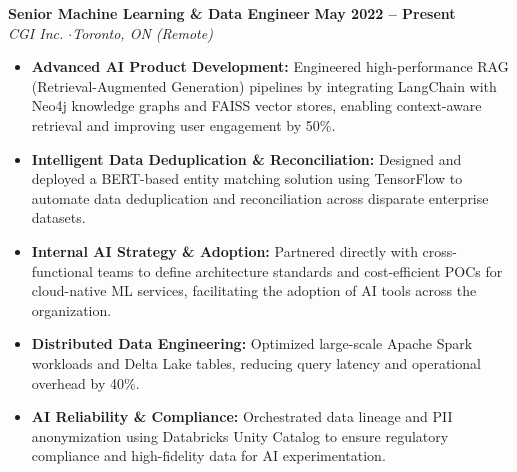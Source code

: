 \documentclass[10pt,letterpaper]{article}
\begin{document}
\noindent
\textbf{\large Senior Machine Learning \& Data Engineer} \hfill \textbf{May 2022 -- Present} \\
\textit{\color{primary} CGI Inc. \quad$\cdot$\quad Toronto, ON (Remote)}
\begin{itemize}
    \item \textbf{Advanced AI Product Development:} Engineered high-performance RAG (Retrieval-Augmented Generation) pipelines by integrating LangChain with Neo4j knowledge graphs and FAISS vector stores, enabling context-aware retrieval and improving user engagement by 50\%.
    \item \textbf{Intelligent Data Deduplication \& Reconciliation:} Designed and deployed a BERT-based entity matching solution using TensorFlow to automate data deduplication and reconciliation across disparate enterprise datasets.
    \item \textbf{Internal AI Strategy \& Adoption:} Partnered directly with cross-functional teams to define architecture standards and cost-efficient POCs for cloud-native ML services, facilitating the adoption of AI tools across the organization.
    \item \textbf{Distributed Data Engineering:} Optimized large-scale Apache Spark workloads and Delta Lake tables, reducing query latency and operational overhead by 40\%.
    \item \textbf{AI Reliability \& Compliance:} Orchestrated data lineage and PII anonymization using Databricks Unity Catalog to ensure regulatory compliance and high-fidelity data for AI experimentation.
\end{itemize}

\vspace{4pt}
\end{document}
